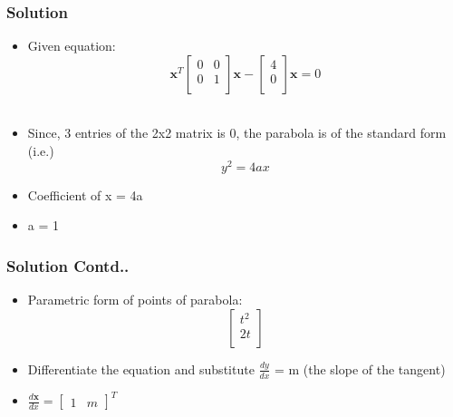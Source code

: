 \documentclass[12pt]{beamer}
\begin{document}
\begin{frame}
\frametitle{Solution}
\begin{itemize}
\item Given equation:
\[
\textbf{x}^T
\begin{bmatrix}
    0 & 0\\
    0 & 1\\  
\end{bmatrix}
\textbf{x}  -  
\begin{bmatrix}
    4\\
    0\\  
\end{bmatrix}
\textbf{x} = 0
\] \\
\item Since, 3 entries of the 2x2 matrix is 0, the parabola is of the standard form (i.e.) \[ y^2 = 4ax\]
\item Coefficient of x = 4a
\item a = 1
\end{itemize}
\end{frame}


\begin{frame}
\frametitle{Solution Contd..}
\begin{itemize}
\item Parametric form of points of parabola: 
\[
\begin{bmatrix}
    t^2\\
    2t\\  
\end{bmatrix}
\]
\item Differentiate the equation and substitute $\frac{dy}{dx}$ = m (the slope of the tangent)
\item $\frac{d\textbf{x}}{dx} = 
\begin{bmatrix}
    1 & m
\end{bmatrix}^T$
\end{itemize}
\end{frame}


\end{document}
